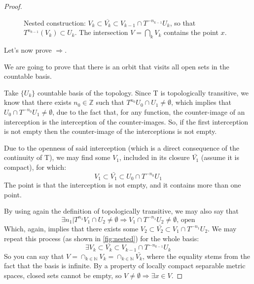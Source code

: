 \begin{proof}
\begin{figure}[ht]
\caption{Nested construction: $V_k\subset\overline{V_k}\subset V_{k-1}\cap T^{-n_{k-1}}U_k$, so that $T^{n_{k-1}}(V_k)\subset U_k$. The intersection $V=\bigcap_k V_k$ contains the point $x$.}
\label{fig:nested}
\end{figure}

    Let's now prove $\Rightarrow$. 

    We are going to prove that there is an orbit that visits all open sets in the countable basis. 

    Take $\{U_k\}$ countable basis of the topology. Since T is topologically transitive, we know that there exists $n_0\in\mathbb{Z}$ such that $T^{n_0}U_0\cap U_1\neq \emptyset$, which implies that $U_0\cap T^{-n_0}U_1\neq \emptyset$, due to the fact that, for any function, the counter-image of an interception is the interception of the counter-images. So, if the first interception is not empty then the counter-image of the interceptions is not empty. 

    Due to the openness of said interception (which is a direct consequence of the continuity of T), we may find some $V_1$, included in its closure $\bar{V_1}$ (assume it is compact), for which: \begin{equation*}
        V_1\subset\bar{V_1}\subset U_0\cap T^{-n_0}U_1
    \end{equation*}
    The point is that the interception is not empty, and it contains more than one point. 
    
    By using again the definition of topologically transitive, we may also say that \begin{equation*}
        \exists n_1 | T^{n_1}V_1\cap U_2\neq\emptyset\Rightarrow V_1\cap T^{-n_1}U_2\neq\emptyset,\,\text{open}
    \end{equation*}
    Which, again, implies that there exists some $V_2\subset\bar{V_2}\subset V_1\cap T^{-n_1}U_2$. We may repeat this process (as shown in \autoref{fig:nested}) for the whole basis:
    \begin{equation*}
        \exists V_k\subset\bar{V_k}\subset V_{k-1}\cap T^{-n_{k-1}}U_k
    \end{equation*}
    So you can say that $V=\cap_{k\in\mathbb{N}}V_k=\cap_{k\in\mathbb{N}}\bar{V_k}$, where the equality stems from the fact that the basis is infinite. By a property of locally compact separable metric spaces, closed sets cannot be empty, so $V\neq\emptyset\Rightarrow\exists x\in V$.


\end{proof}
